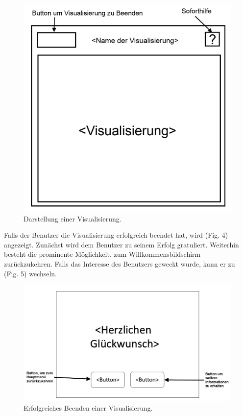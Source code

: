 \documentclass{article}
\begin{document}
\begin{figure}[H]
  \centering
    \includegraphics[width=\textwidth]{resources/ui_walkthrough_visualisation-draft}
  \caption{Darstellung einer Visualisierung.}
\end{figure}

Falls der Benutzer die Visualisierung erfolgreich beendet hat, wird (Fig. 4) angezeigt. Zunächst wird dem Benutzer zu seinem Erfolg gratuliert. Weiterhin besteht die prominente Möglichkeit, zum Willkommensbildschirm zurückzukehren. Falls das Interesse des Benutzers geweckt wurde, kann er zu (Fig. 5) wechseln.

\begin{figure}[H]
  \centering
    \includegraphics[width=\textwidth]{resources/ui_walkthrough_end-draft}
  \caption{Erfolgreiches Beenden einer Visualisierung.}
\end{figure}
\end{document}
